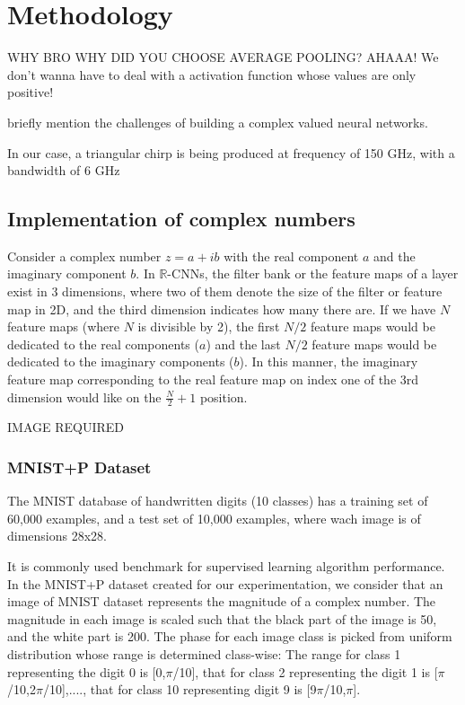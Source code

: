 \chapter{Methodology} \label{chap:methodology}
 
 WHY BRO WHY DID YOU CHOOSE AVERAGE POOLING?
 AHAAA!  We don't wanna have to deal with a activation function whose values are only positive!
 
 briefly mention the challenges of building a complex valued neural networks. 
 
 
   In our case, a triangular chirp is being produced at frequency of 150 GHz, with a bandwidth of 6 GHz
   
 \section{Implementation of complex numbers}
 Consider a complex number $z=a+ib$ with the real component $a$ and the imaginary component $b$. In $\mathbb{R}$-CNNs, the filter bank or the feature maps of a layer exist in 3 dimensions, where two of them denote the size of the filter or feature map in 2D, and the third dimension indicates how many there are. If we have $N$ feature maps (where $N$ is divisible by 2), the first $N/2$ feature maps would be dedicated to the real components ($a$) and the last $N/2$ feature maps would be dedicated to the imaginary components ($b$). In this manner, the imaginary feature map corresponding to the real feature map on index one of the 3rd dimension would like on the $\frac{N}{2} +1$ position.
 
 IMAGE REQUIRED
 
 \subsection{MNIST+P Dataset}
 The MNIST database of handwritten digits (10 classes) has a training set of 60,000 examples, and a test set of 10,000 examples, where wach image is of dimensions 28x28. 
 
 
 It is commonly used benchmark for supervised learning algorithm performance. In the MNIST+P dataset created for our experimentation, we consider that an image of MNIST dataset represents the magnitude of a complex number. The magnitude in each image is scaled such that the black part of the image is 50, and the white part is 200. The phase for each image class is picked from uniform distribution whose range is determined class-wise: The range for class 1 representing the digit 0 is [0,$\pi$/10], that for class 2 representing the digit 1 is [$\pi$/10,2$\pi$/10],...., that for class 10 representing digit 9 is [9$\pi$/10,$\pi$]. 
 
